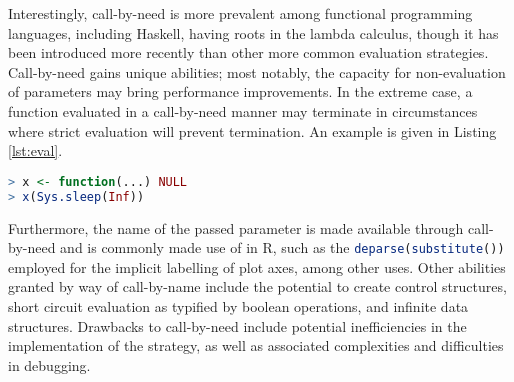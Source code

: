 Interestingly, call-by-need is more prevalent among functional programming languages, including Haskell, having roots in the lambda calculus, though it has been introduced more recently than other more common evaluation strategies\cite{nita2017haskell}.
Call-by-need gains unique abilities; most notably, the capacity for non-evaluation of parameters may bring performance improvements.
In the extreme case, a function evaluated in a call-by-need manner may terminate in circumstances where strict evaluation will prevent termination.
An example is given in Listing \cref{lst:eval}.

\begin{lstlisting}[language=R,float,caption={Evaluation of this program will terminate under call-by-need but not terminate under strict evaluation},label=lst:eval]
> x <- function(...) NULL
> x(Sys.sleep(Inf))
\end{lstlisting}

Furthermore, the name of the passed parameter is made available through call-by-need and is commonly made use of in R, such as the \lstinline[language=R]{deparse(substitute())} employed for the implicit labelling of plot axes, among other uses.
Other abilities granted by way of call-by-name include the potential to create control structures, short circuit evaluation as typified by boolean operations, and infinite data structures.
Drawbacks to call-by-need include potential inefficiencies in the implementation of the strategy, as well as associated complexities and difficulties in debugging\cite{nilsson1999lazydebug}.


